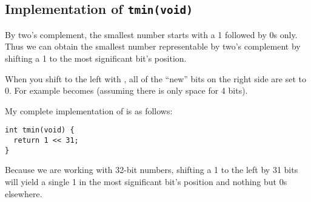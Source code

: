 \subsection{Implementation of \texttt{tmin(void)}}

By two's complement, the smallest number starts with a 1 followed by 0s only. Thus we can obtain the smallest number representable by two's complement by shifting a 1 to the most significant bit's position.


When you shift to the left with \code{<<}, all of the ``new'' bits on the right side are set to 0. For example  becomes  (assuming there is only space for 4 bits).

My complete implementation of  is as follows:

\begin{verbatim}
int tmin(void) {
  return 1 << 31;
}
\end{verbatim}

Because we are working with 32-bit numbers, shifting a 1 to the left by 31 bits will yield a single 1 in the most significant bit's position and nothing but 0s elsewhere.
